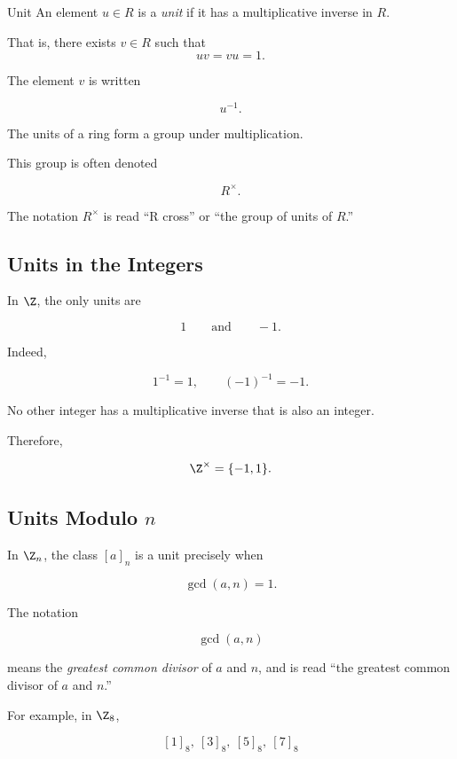 \begin{definitionbox}{Unit}
An element \(u\in R\) is a \emph{unit} if it has a multiplicative inverse in
\(R\).

That is, there exists \(v\in R\) such that
\[ uv=vu=1. \]
\end{definitionbox}

The element \(v\) is written

\[ u^{-1}. \]

The units of a ring form a group under multiplication.

This group is often denoted

\[ R^\times. \]

The notation \(R^\times\) is read ``R cross'' or ``the group of units of
\(R\).''

\subsection{Units in the Integers}
\label{subsec:integer-units}

In \(\Z\), the only units are

\[ 1\qquad\text{and}\qquad -1. \]

Indeed,

\[ 1^{-1}=1,\qquad(-1)^{-1}=-1. \]

No other integer has a multiplicative inverse that is also an integer.

Therefore,

\[ \Z^\times=\{-1,1\}. \]

\subsection{Units Modulo \(n\)}
\label{subsec:units-mod-n}

In \(\Z_n\), the class \([a]_n\) is a unit precisely when

\[ \gcd(a,n)=1. \]

The notation

\[ \gcd(a,n) \]

means the \emph{greatest common divisor} of \(a\) and \(n\), and is read
``the greatest common divisor of \(a\) and \(n\).''

For example, in \(\Z_8\),

\[ [1]_8,\ [3]_8,\ [5]_8,\ [7]_8 \]


